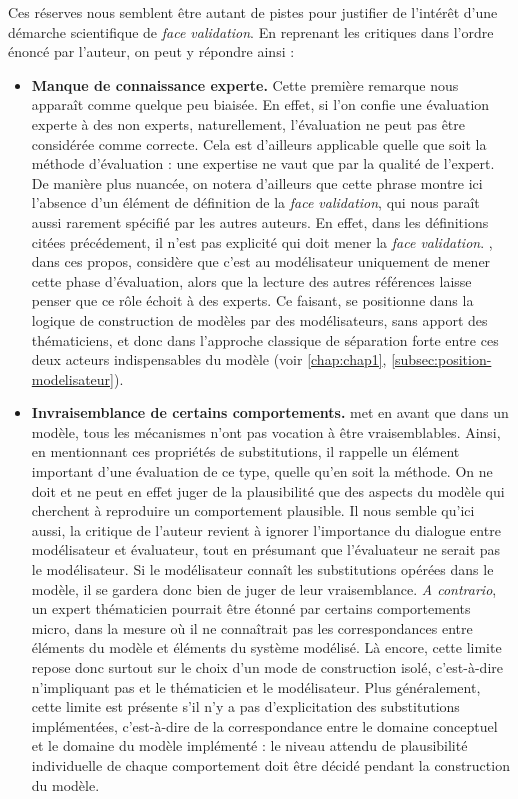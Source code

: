 Ces réserves nous semblent être autant de pistes pour justifier de l'intérêt d'une démarche scientifique de \textit{face validation}. En reprenant les critiques dans l'ordre énoncé par l'auteur, on peut y répondre ainsi :
\begin{itemize}
	\item \textbf{Manque de connaissance experte.}
	Cette première remarque nous apparaît comme quelque peu biaisée.
	En effet, si l'on confie une évaluation experte à des non experts, naturellement, l'évaluation ne peut pas être considérée comme correcte.
	Cela est d'ailleurs applicable quelle que soit la méthode d'évaluation : une expertise ne vaut que par la qualité de l'expert.
	De manière plus nuancée, on notera d'ailleurs que cette phrase montre ici l'absence d'un élément de définition de la \textit{face validation}, qui nous paraît aussi rarement spécifié par les autres auteurs.
	En effet, dans les définitions citées précédement, il n'est pas explicité qui doit mener la \textit{face validation}.
	\citeauthor{hermann_validation_1967}, dans ces propos, considère que c'est au modélisateur uniquement de mener cette phase d'évaluation, alors que la lecture des autres références laisse penser que ce rôle échoit à des experts.
	Ce faisant, \citeauthor{hermann_validation_1967} se positionne dans la logique de construction de modèles par des modélisateurs, sans apport des thématiciens, et donc dans l'approche classique de séparation forte entre ces deux acteurs indispensables du modèle (voir \cref{chap:chap1}, \cref{subsec:position-modelisateur}).
	
	\item \textbf{Invraisemblance de certains comportements.}
	\citeauthor{hermann_validation_1967} met en avant que dans un modèle, tous les mécanismes n'ont pas vocation à être vraisemblables.
	Ainsi, en mentionnant ces \og propriétés de substitutions\fg{}, il rappelle un élément important d'une évaluation de ce type, quelle qu'en soit la méthode.
	On ne doit et ne peut en effet juger de la plausibilité que des aspects du modèle qui cherchent à reproduire un comportement plausible.
	Il nous semble qu'ici aussi, la critique de l'auteur revient à ignorer l'importance du dialogue entre modélisateur et évaluateur, tout en présumant que l'évaluateur ne serait pas le modélisateur.
	Si le modélisateur connaît les \og substitutions\fg{} opérées dans le modèle, il se gardera donc bien de juger de leur vraisemblance.
	\textit{A contrario}, un expert thématicien pourrait être étonné par certains comportements micro, dans la mesure où il ne connaîtrait pas les correspondances entre éléments du modèle et éléments du système modélisé.
	Là encore, cette limite repose donc surtout sur le choix d'un mode de construction isolé, c'est-à-dire n'impliquant pas et le thématicien et le modélisateur.
	Plus généralement, cette limite est présente s'il n'y a pas d'explicitation des \og substitutions\fg{} implémentées, c'est-à-dire de la correspondance entre le domaine conceptuel et le domaine du modèle implémenté : le niveau attendu de plausibilité individuelle de chaque comportement doit être décidé pendant la construction du modèle.
	

\end{itemize}
